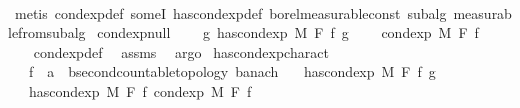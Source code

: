 \begin{isabellebody}
%
\isadelimproof
\ \ %
\endisadelimproof
%
\isatagproof
{}\isamarkupfalse%
\ {\isacharparenleft}{\kern0pt}metis\ cond{\isacharunderscore}{\kern0pt}exp{\isacharunderscore}{\kern0pt}def\ someI\ has{\isacharunderscore}{\kern0pt}cond{\isacharunderscore}{\kern0pt}exp{\isacharunderscore}{\kern0pt}def\ borel{\isacharunderscore}{\kern0pt}measurable{\isacharunderscore}{\kern0pt}const\ subalg\ measurable{\isacharunderscore}{\kern0pt}from{\isacharunderscore}{\kern0pt}subalg{\isacharparenright}{\kern0pt}%
\endisatagproof
{\isafoldproof}%
%
\isadelimproof
\isanewline
%
\endisadelimproof
\isanewline
{}\isamarkupfalse%
\ cond{\isacharunderscore}{\kern0pt}exp{\isacharunderscore}{\kern0pt}null{\isacharcolon}{\kern0pt}\ \isanewline
\ \ \ {\isachardoublequoteopen}{\isasymnexists}g{\isachardot}{\kern0pt}\ has{\isacharunderscore}{\kern0pt}cond{\isacharunderscore}{\kern0pt}exp\ M\ F\ f\ g{\isachardoublequoteclose}\ \isanewline
\ \ \ {\isachardoublequoteopen}cond{\isacharunderscore}{\kern0pt}exp\ M\ F\ f\ {\isacharequal}{\kern0pt}\ {\isacharparenleft}{\kern0pt}{\isasymlambda}{\isacharunderscore}{\kern0pt}{\isachardot}{\kern0pt}\ {}{\isacharparenright}{\kern0pt}{\isachardoublequoteclose}\isanewline
%
\isadelimproof
\ \ %
\endisadelimproof
%
\isatagproof
{}\isamarkupfalse%
\ cond{\isacharunderscore}{\kern0pt}exp{\isacharunderscore}{\kern0pt}def\ \isamarkupfalse%
\ assms\ \isamarkupfalse%
\ argo%
\endisatagproof
{\isafoldproof}%
%
\isadelimproof
\isanewline
%
\endisadelimproof
\isanewline
{}\isamarkupfalse%
\ has{\isacharunderscore}{\kern0pt}cond{\isacharunderscore}{\kern0pt}exp{\isacharunderscore}{\kern0pt}charact{\isacharcolon}{\kern0pt}\isanewline
\ \ \ f\ {\isacharcolon}{\kern0pt}{\isacharcolon}{\kern0pt}\ {\isachardoublequoteopen}{\isacharprime}{\kern0pt}a\ {\isasymRightarrow}\ {\isacharprime}{\kern0pt}b{\isacharcolon}{\kern0pt}{\isacharcolon}{\kern0pt}{\isacharbraceleft}{\kern0pt}second{\isacharunderscore}{\kern0pt}countable{\isacharunderscore}{\kern0pt}topology{\isacharcomma}{\kern0pt}\ banach{\isacharbraceright}{\kern0pt}{\isachardoublequoteclose}\isanewline
\ \ \ {\isachardoublequoteopen}has{\isacharunderscore}{\kern0pt}cond{\isacharunderscore}{\kern0pt}exp\ M\ F\ f\ g{\isachardoublequoteclose}\isanewline
\ \ \ {\isachardoublequoteopen}has{\isacharunderscore}{\kern0pt}cond{\isacharunderscore}{\kern0pt}exp\ M\ F\ f\ {\isacharparenleft}{\kern0pt}cond{\isacharunderscore}{\kern0pt}exp\ M\ F\ f{\isacharparenright}{\kern0pt}{\isachardoublequoteclose}\isanewline

\end{isabellebody}
